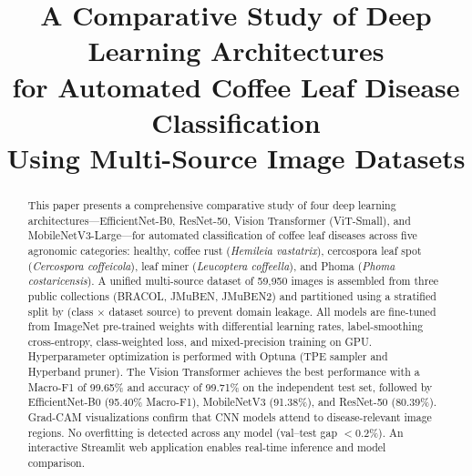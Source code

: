 \documentclass[conference]{IEEEtran}
\begin{document}
\title{A Comparative Study of Deep Learning Architectures\\
for Automated Coffee Leaf Disease Classification\\
Using Multi-Source Image Datasets}

\author{
  \and
}

\maketitle

\begin{abstract}
This paper presents a comprehensive comparative study of four deep learning
architectures—EfficientNet-B0, ResNet-50, Vision Transformer (ViT-Small),
and MobileNetV3-Large—for automated classification of coffee leaf diseases
across five agronomic categories: healthy, coffee rust (\textit{Hemileia
vastatrix}), cercospora leaf spot (\textit{Cercospora coffeicola}), leaf
miner (\textit{Leucoptera coffeella}), and Phoma (\textit{Phoma
costaricensis}). A unified multi-source dataset of 59{,}950 images is
assembled from three public collections (BRACOL, JMuBEN, JMuBEN2) and
partitioned using a stratified split by (class $\times$ dataset source) to
prevent domain leakage. All models are fine-tuned from ImageNet
pre-trained weights with differential learning rates, label-smoothing
cross-entropy, class-weighted loss, and mixed-precision training on GPU.
Hyperparameter optimization is performed with Optuna (TPE sampler and
Hyperband pruner). The Vision Transformer achieves the best performance
with a Macro-F1 of 99.65\% and accuracy of 99.71\% on the independent
test set, followed by EfficientNet-B0 (95.40\% Macro-F1), MobileNetV3
(91.38\%), and ResNet-50 (80.39\%). Grad-CAM visualizations confirm that
CNN models attend to disease-relevant image regions. No overfitting is
detected across any model (val--test gap $<$0.2\%). An interactive
Streamlit web application enables real-time inference and model comparison.
\end{abstract}
\end{document}
